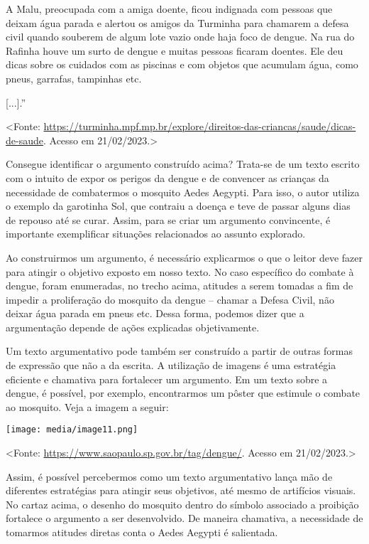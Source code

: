A Malu, preocupada com a amiga doente, ficou indignada com pessoas que
deixam água parada e alertou os amigos da Turminha para chamarem a
defesa civil quando souberem de algum lote vazio onde haja foco de
dengue. Na rua do Rafinha houve um surto de dengue e muitas pessoas
ficaram doentes. Ele deu dicas sobre os cuidados com as piscinas e com
objetos que acumulam água, como pneus, garrafas, tampinhas etc.

{[}...{]}.''

\textless{}Fonte:
\url{https://turminha.mpf.mp.br/explore/direitos-das-criancas/saude/dicas-de-saude}.
Acesso em 21/02/2023.\textgreater{}

Consegue identificar o argumento construído acima? Trata-se de um texto
escrito com o intuito de expor os perigos da dengue e de convencer as
crianças da necessidade de combatermos o mosquito Aedes Aegypti. Para
isso, o autor utiliza o exemplo da garotinha Sol, que contraiu a doença
e teve de passar alguns dias de repouso até se curar. Assim, para se
criar um argumento convincente, é importante exemplificar situações
relacionados ao assunto explorado.

Ao construirmos um argumento, é necessário explicarmos o que o leitor
deve fazer para atingir o objetivo exposto em nosso texto. No caso
específico do combate à dengue, foram enumeradas, no trecho acima,
atitudes a serem tomadas a fim de impedir a proliferação do mosquito da
dengue -- chamar a Defesa Civil, não deixar água parada em pneus etc.
Dessa forma, podemos dizer que a argumentação depende de ações
explicadas objetivamente.

Um texto argumentativo pode também ser construído a partir de outras
formas de expressão que não a da escrita. A utilização de imagens é uma
estratégia eficiente e chamativa para fortalecer um argumento. Em um
texto sobre a dengue, é possível, por exemplo, encontrarmos um pôster
que estimule o combate ao mosquito. Veja a imagem a seguir:

\texttt{[image: media/image11.png]}

\textless{}Fonte: \url{https://www.saopaulo.sp.gov.br/tag/dengue/}.
Acesso em 21/02/2023.\textgreater{}

Assim, é possível percebermos como um texto argumentativo lança mão de
diferentes estratégias para atingir seus objetivos, até mesmo de
artifícios visuais. No cartaz acima, o desenho do mosquito dentro do
símbolo associado a proibição fortalece o argumento a ser desenvolvido.
De maneira chamativa, a necessidade de tomarmos atitudes diretas conta o
Aedes Aegypti é salientada.

